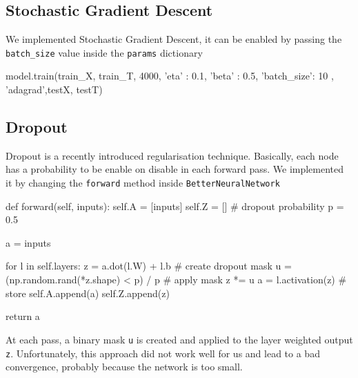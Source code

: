 \documentclass[11pt]{article}
\begin{document}
\subsection{Stochastic Gradient Descent}
We implemented Stochastic Gradient Descent, it can be enabled by passing the \texttt{batch\_size} value inside the \texttt{params} dictionary

\begin{python}
model.train(train_X, train_T, 4000, { 'eta' : 0.1, 'beta' : 0.5, 'batch_size': 10 }, 'adagrad',testX, testT)	
\end{python}
\subsection{Dropout}
Dropout is a recently introduced regularisation technique. Basically, each node has a probability to be enable on disable in each forward pass. We implemented it by changing the \texttt{forward} method inside \texttt{BetterNeuralNetwork}
\begin{python}
def forward(self, inputs):
    self.A = [inputs]
    self.Z = []
    # dropout probability
    p = 0.5
    
    a = inputs

    for l in self.layers:
        z = a.dot(l.W) + l.b
        # create dropout mask
        u = (np.random.rand(*z.shape) < p) / p
        # apply mask
        z *= u
        a = l.activation(z)
        # store
        self.A.append(a)
        self.Z.append(z)

    return a
\end{python}
At each pass, a binary mask \texttt{u} is created and applied to the layer weighted output \texttt{z}. Unfortunately, this approach did not work well for us and lead to a bad convergence, probably because the network is too small.
\end{document}
